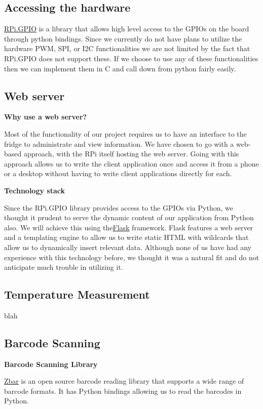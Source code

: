 \documentclass[10pt]{article}
\begin{document}
\subsection{Accessing the hardware}
\hyperref[https://pypi.python.org/pypi/RPi.GPIO]{RPi.GPIO} is a library that allows high level access to the GPIOs on the board through python bindings. Since we currently do not have plans to utilize the hardware PWM, SPI, or I2C functionalities we are not limited by the fact that RPi.GPIO does not support these. If we choose to use any of these functionalities then we can implement them in C and call down from python fairly easily.

\subsection{Web server}
\textbf{Why use a web server?}

Most of the functionality of our project requires us to have an interface to the fridge to administrate and view information. We have chosen to go with a web-based approach, with the RPi itself hosting the web server. Going with this approach allows us to write the client application once and access it from a phone or a desktop without having to write client applications directly for each.

\textbf{Technology stack}

Since the RPi.GPIO library provides access to the GPIOs via Python, we thought it prudent to serve the dynamic content of our application from Python also. We will achieve this using the\hyperref[http://flask.pocoo.org/]{Flask} framework. Flask features a web server and a templating engine to allow us to write static HTML with wildcards that allow us to dynamically insert relevant data. Although none of us have had any experience with this technology before, we thought it was a natural fit and do not anticipate much trouble in utilizing it.

\subsection{Temperature Measurement}

blah

\subsection{Barcode Scanning}
\textbf{Barcode Scanning Library}

\hyperref[http://zbar.sourceforge.net/]{Zbar} is an open source barcode reading library that supports a wide range of barcode formats. It has Python bindings allowing us to read the barcodes in Python.
\end{document}
